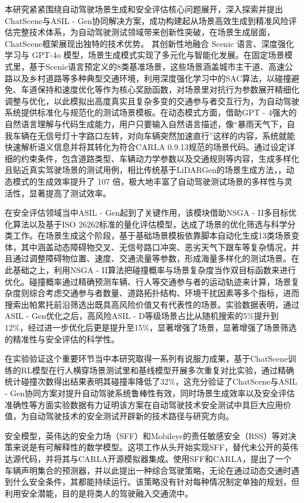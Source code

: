 本研究紧紧围绕自动驾驶场景生成和安全评估核心问题展开，深入探索并提出ChatScene与ASIL - Gen协同解决方案，成功构建起从场景高效生成到精准风险评估完整技术体系，为自动驾驶测试领域带来创新性突破，在场景生成层面，ChatScene框架展现出独特的技术优势。
其创新性地融合 Scenic 语言、深度强化学习与 GPT-4o 模型，场景生成模式实现了多元化与智能化发展。在固定场景模式里，基于Scenic语言预定义的8类基准场景，这些场景涵盖城市主干道、高速公路以及乡村道路等多种典型交通环境，利用深度强化学习中的SAC算法，以碰撞避免、车道保持和速度优化等作为核心奖励函数，对场景里对抗行为参数展开精细化调整与优化，以此模拟出高度真实且复杂多变的交通参与者交互行为，为自动驾驶系统提供标准化与规范化的测试场景模板。在动态模式方面，借助GPT - 4强大的自然语言理解与代码生成能力，用户只要输入自然语言描述，像“暴雨天气下，自我车辆在无信号灯十字路口左转，对向车辆突然加速直行”这样的内容，系统就能快速解析语义信息并将其转化为符合CARLA 0.9.13规范的场景代码。通过设定详细的约束条件，包含道路类型、车辆动力学参数以及交通规则等内容，生成多样化且贴近真实驾驶场景的测试用例，相比传统基于LiDARGen的场景生成方法，，动态模式的生成效率提升了 107 倍，极大地丰富了自动驾驶测试场景的多样性与灵活性，显著提高了测试效率。​

在安全评估领域当中ASIL - Gen起到了关键作用，该模块借助NSGA - II多目标优化算法以及基于ISO 26262标准的量化评估模型，达成了场景的优化筛选与科学分类工作。在场景生成这个阶段，基于基础场景模板依靠脚本自动化生成13类场景变体，其中涵盖动态障碍物交叉、无信号路口冲突、恶劣天气下跟车等复杂情况，并且通过调整障碍物位置、速度、交通流量等参数，形成海量多样化的测试场景。在此基础之上，利用NSGA - II算法把碰撞概率与场景复杂度当作双目标函数来进行优化。碰撞概率通过精确预测车辆、行人等交通参与者的运动轨迹来计算，场景复杂度则综合考虑交通参与者数量、道路拓扑结构、环境干扰因素等多个指标，进而搜索出帕累托前沿筛选出既具高风险价值又有代表性的场景。实验数据表明，通过ASIL - Gen优化之后，高风险ASIL - D等级场景占比从随机搜索的5\%提升到12\%，经过进一步优化后更是提升至15\%，显著增强了场景，显著增强了场景筛选的精准性与安全评估的科学性。​

在实验验证这个重要环节当中本研究取得一系列有说服力成果，基于ChatScene训练的RL模型在行人横穿场景测试里和基线模型开展多次重复对比实验，通过精确统计碰撞次数得出结果表明其碰撞率降低了32\%，这充分验证了ChatScene与ASIL - Gen协同方案对提升自动驾驶系统鲁棒性有效，同时场景生成效率以及安全评估准确性等方面实验数据有力证明该方案在自动驾驶技术安全测试中具巨大应用价值，为自动驾驶技术的安全测试开辟新的技术路径与研究方向。

安全模型，英伟达的安全力场（SFF）和Mobileye的责任敏感安全（RSS）等对决策来说是有可解释性的数学模型。这项工作从头开始实现SFF，替代未公开的英伟达源代码，并将其与CARLA开源模拟器集成。使用SFF和CARLA，提出了一个车辆声明集合的预测器，并以此提出一种综合驾驶策略，无论在通过动态交通时遇到什么安全条件，其都能持续运行。该策略没有针对每种情况制定单独的规划，但利用安全潜能，目的是将类人的驾驶融入交通流中。



